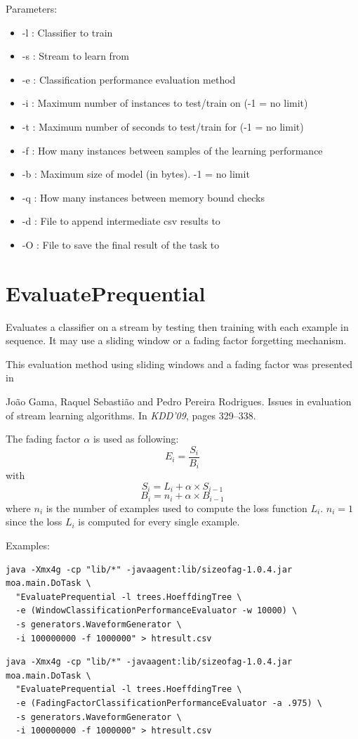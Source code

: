 \documentclass[a4paper,12pt,twoside]{book}
\begin{document}
Parameters:
\begin{itemize}
\item -l : Classifier to train
\item -s : Stream to learn from
\item -e : Classification performance evaluation method
\item -i : Maximum number of instances to test/train on  (-1 = no limit)
\item -t : Maximum number of seconds to test/train for (-1 = no limit)
\item -f : How many instances between samples of the learning performance
\item -b : Maximum size of model (in bytes). -1 = no limit
\item -q : How many instances between memory bound checks
\item -d : File to append intermediate csv results to
\item -O : File to save the final result of the task to
\end{itemize}



\section{EvaluatePrequential}
 Evaluates a classifier on a stream by testing then training with each example in sequence.
It may use a sliding window or a fading factor forgetting mechanism.

This evaluation method using sliding windows and a fading factor was presented in

\begin{itemize}
Jo{\~a}o Gama, Raquel Sebasti{\~a}o and Pedro Pereira Rodrigues.
\newblock Issues in evaluation of stream learning algorithms.
\newblock In {\em KDD'09}, pages 329--338.\end{itemize}

The fading factor $\alpha$ is used as following:
$$E_i = \frac{S_i} {B_i}$$
with
 $$S_i = L_i + \alpha \times S_{i-1}$$ $$B_i = n_i + \alpha \times B_{i-1}$$
where $n_i$ is the number of examples used to compute the loss function $L_i$.
$n_i = 1$ since the loss $L_i$ is computed for every single example.


Examples:
\begin{footnotesize}\begin{verbatim}
java -Xmx4g -cp "lib/*" -javaagent:lib/sizeofag-1.0.4.jar moa.main.DoTask \
  "EvaluatePrequential -l trees.HoeffdingTree \
  -e (WindowClassificationPerformanceEvaluator -w 10000) \
  -s generators.WaveformGenerator \
  -i 100000000 -f 1000000" > htresult.csv
\end{verbatim}
\begin{verbatim}
java -Xmx4g -cp "lib/*" -javaagent:lib/sizeofag-1.0.4.jar moa.main.DoTask \
  "EvaluatePrequential -l trees.HoeffdingTree \
  -e (FadingFactorClassificationPerformanceEvaluator -a .975) \
  -s generators.WaveformGenerator \
  -i 100000000 -f 1000000" > htresult.csv
\end{verbatim}

\end{footnotesize}
\end{document}
